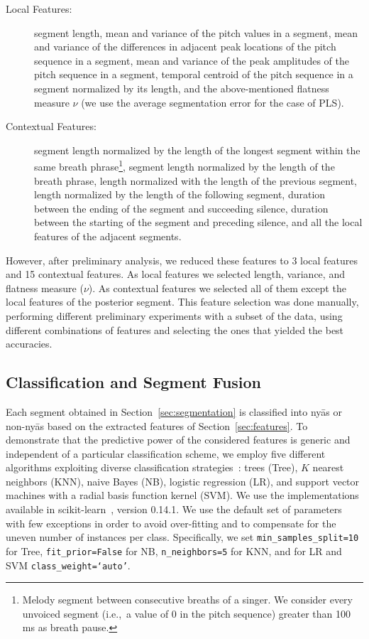 {\begin{description}
	\item[Local Features:] segment length, mean and variance of the pitch values in a segment, mean and variance of the differences in adjacent peak locations of the pitch sequence in a segment, mean and variance of the  peak amplitudes of the pitch sequence in a segment, temporal centroid of the pitch sequence in a segment normalized by its length, and the above-mentioned flatness measure $\nu$ (we use the average segmentation error for the case of PLS).
	\item[Contextual Features:] segment length normalized by the length of the longest segment within the same breath phrase\footnote{Melody segment between consecutive breaths of a singer. We consider every unvoiced segment (i.e.,~a value of 0 in the pitch sequence) greater than 100\,ms as breath pause.}, segment length normalized by the length of the breath phrase, length normalized with the length of the previous segment, length normalized by the length of the following segment, duration between the ending of the segment and succeeding silence, duration between the starting of the segment and preceding silence, and all the local features of the adjacent segments.
\end{description}

However, after preliminary analysis, we reduced these features to 3 local features and 15 contextual features. As local features we selected length, variance, and flatness measure ($\nu$). As contextual features we selected all of them except the local features of the posterior segment. This feature selection was done manually, performing different preliminary experiments with a subset of the data, using different combinations of features and selecting the ones that yielded the best accuracies.

\subsection{Classification and Segment Fusion}

Each segment obtained in Section~\ref{sec:segmentation} is classified into ny\={a}s or non-ny\={a}s based on the extracted features of Section~\ref{sec:features}. To demonstrate that the predictive power of the considered features is generic and independent of a particular classification scheme, we employ five different algorithms exploiting diverse classification strategies~\cite{Hastie09BOOK}: trees (Tree), $K$ nearest neighbors (KNN), naive Bayes (NB), logistic regression (LR), and support vector machines with a radial basis function kernel (SVM). We use the implementations available in scikit-learn~\cite{scikitlearn}, version 0.14.1. We use the default set of parameters with few exceptions in order to avoid over-fitting and to compensate for the uneven number of instances per class. Specifically, we set \texttt{min\_samples\_split=10} for Tree, \texttt{fit\_prior=False} for NB, \texttt{n\_neighbors=5} for KNN, and for LR and SVM \texttt{class\_weight=`auto'}.

}

